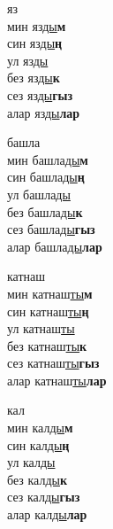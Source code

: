\begin{multicols}{4}
\begin{enumerate}
\begin{minipage}{\linewidth}
    \item
    яз\\
    мин яз\underline{ды}\textbf{м}\\
    син яз\underline{ды}\textbf{ң}\\
    ул яз\underline{ды}\\
    без яз\underline{ды}\textbf{к}\\
    сез яз\underline{ды}\textbf{гыз}\\
    алар яз\underline{ды}\textbf{лар}\\
\end{minipage}

\begin{minipage}{\linewidth}
    \item
    башла\\
    мин башла\underline{ды}\textbf{м}\\
    син башла\underline{ды}\textbf{ң}\\
    ул башла\underline{ды}\\
    без башла\underline{ды}\textbf{к}\\
    сез башла\underline{ды}\textbf{гыз}\\
    алар башла\underline{ды}\textbf{лар}\\
\end{minipage}

\begin{minipage}{\linewidth}
    \item
    катнаш\\
    мин катнаш\underline{ты}\textbf{м}\\
    син катнаш\underline{ты}\textbf{ң}\\
    ул катнаш\underline{ты}\\
    без катнаш\underline{ты}\textbf{к}\\
    сез катнаш\underline{ты}\textbf{гыз}\\
    алар катнаш\underline{ты}\textbf{лар}\\
\end{minipage}

\begin{minipage}{\linewidth}
    \item
    кал\\
    мин кал\underline{ды}\textbf{м}\\
    син кал\underline{ды}\textbf{ң}\\
    ул кал\underline{ды}\\
    без кал\underline{ды}\textbf{к}\\
    сез кал\underline{ды}\textbf{гыз}\\
    алар кал\underline{ды}\textbf{лар}\\
\end{minipage}


\end{enumerate}
\end{multicols}
